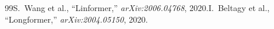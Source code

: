 \begin{thebibliography}{99}S.~Wang et al., ``Linformer,'' \emph{arXiv:2006.04768}, 2020.I.~Beltagy et al., ``Longformer,'' \emph{arXiv:2004.05150}, 2020.\end{thebibliography}
